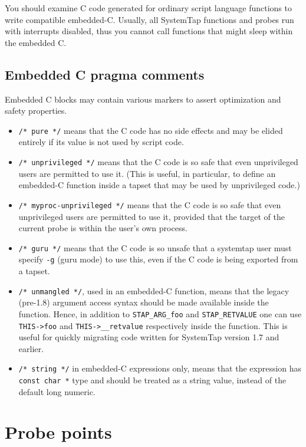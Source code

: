 \documentclass[twoside,english]{article}
\begin{document}
You should examine C code generated for ordinary script language
functions to write compatible embedded-C.  Usually, all SystemTap
functions and probes run with interrupts disabled, thus you cannot
call functions that might sleep within the embedded C.

\subsection{Embedded C pragma comments}

Embedded C blocks may contain various markers to assert optimization
and safety properties.

\begin{itemize}
\item \verb+/* pure */+ means that the C code has no side effects and
  may be elided entirely if its value is not used by script code.
\item \verb+/* unprivileged */+ means that the C code is so safe that
  even unprivileged users are permitted to use it. (This is useful, in
  particular, to define an embedded-C function inside a tapset that
  may be used by unprivileged code.)
\item \verb+/* myproc-unprivileged */+ means that the C code is so
  safe that even unprivileged users are permitted to use it, provided
  that the target of the current probe is within the user's own
  process.
\item \verb+/* guru */+ means that the C code is so unsafe that a
  systemtap user must specify \verb+-g+ (guru mode) to use this, even
  if the C code is being exported from a tapset.
\item \verb+/* unmangled */+, used in an embedded-C function, means
  that the legacy (pre-1.8) argument access syntax should be made
  available inside the function. Hence, in addition to
  \verb+STAP_ARG_foo+ and \verb+STAP_RETVALUE+ one can use
  \verb+THIS->foo+ and \verb+THIS->__retvalue+ respectively inside the
  function. This is useful for quickly migrating code written for
  SystemTap version 1.7 and earlier.
\item \verb+/* string */+ in embedded-C expressions only, means that
  the expression has \verb+const char *+ type and should be treated as
  a string value, instead of the default long numeric.
\end{itemize}

\section{Probe points\label{sec:Probe-Points}}
\end{document}
